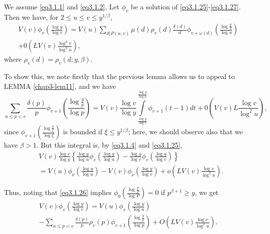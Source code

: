 \begin{Lemma}\label{chap3-lem13}%
We assume \eqref{eq3.1.1} and \eqref{eq3.1.2}. Let $\phi_v$ be a solution of
\eqref{eq3.1.25}-\eqref{eq3.1.27}. Then we have, for $2 \le u \le v
\le y^{1/ \beta}$,  
\begin{multline*}
  V(v)\phi_v \left(\frac {\log y}{\log v}\right)=V (u) \sum _{d|P(u,v)} \mu
  (d)\rho_v (d) \frac{\delta(d)}{d} \phi_{v+ \omega(d)} \left(\frac {\log
    \frac{y}{d}}{\log u}\right) \\
   + 0\left(L V(v) \frac{\log^2 v}{\log^3 u}\right),
\end{multline*}\pageoriginale
where $\rho_v (d)= \rho_v (d; y, \beta)$.
\end{Lemma}

To show this, we note firstly that the previous lemma allows us to
appeal to LEMMA \ref{chap3-lem11}, and we have 
$$
  \sum_{u \le p <v} \frac{\delta (p)}{p}\phi_{v+1} \left(\frac {\log
    \frac{y}{p}}{\log p}\right)=V(v)\frac{\log v}{\log y} \int
  \limits^{\frac{\log y}{\log u}}_{\frac{\log y}{\log v}} \phi
  _{v+1}(t-1)dt +0\left(V(v) L \frac{\log v}{\log^2 u}\right), 
$$ 
since $\phi_{v+1} \left(\frac {\log \frac{y}{\xi}}{\log \xi}\right)$ is bounded
if $\xi \le y^{1/\beta}$; here, we should observe also that we have
$\beta > 1$. But this integral is, by \eqref{eq3.1.4} and \eqref{eq3.1.25}, 
\begin{align*}
  &V(v) \frac{\log v}{\log y} \left\{ \frac{\log y}{\log u} \phi_v
  \left(\frac{\log y}{\log u}\right)-\frac{\log y}{\log v}\phi_v
  \left(\frac{\log y}{\log v}\right) \right\}\\ 
  & =V(u)\phi_\nu \left(\frac{\log y}{\log u}\right)-V(v)\phi_\nu
  \left(\frac{\log y}{\log v}\right)+o\left(LV(v) \frac{\log
    v}{\log^2 u}\right).   
\end{align*}

Thus, noting that \eqref{eq3.1.26} implies $\phi_0 \left(\frac{\log
  \frac{y}{P}}{\log P}\right)=0$ if $p^{\beta +1}\ge y$, we get 
\begin{multline*}
  V(v)\phi_v \left(\frac{\log y}{\log v}\right)=V(u) \phi_v \left(\frac{\log
    y}{\log u}\right)\\ 
  - \sum_{u \le p< v} \frac{\delta (p)}{p}\rho_v (p)
  \phi_{v+1}\left(\frac{\log \frac{y}{p}}{\log p}\right)+ O\left(LV(v)\frac{\log
    v}{\log^2 u}\right).  
\end{multline*}

